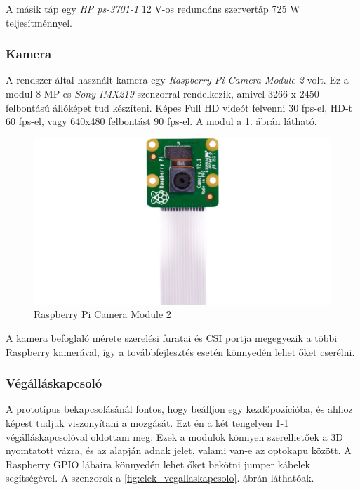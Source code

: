 \documentclass[12pt,a4paper]{article}
\begin{document}
A másik táp egy \textsl{HP ps-3701-1} 12 V-os redundáns szervertáp 725 W teljesítménnyel. 

\subsubsection*{Kamera}
A rendszer által használt kamera egy \textsl{Raspberry Pi Camera Module 2} volt.\cite{raspberrycam} Ez a modul 8 MP-es \textsl{Sony IMX219} szenzorral rendelkezik, amivel 3266 x 2450 felbontású állóképet tud készíteni. Képes Full HD videót felvenni 30 fps-el, HD-t 60 fps-el, vagy 640x480 felbontást 90 fps-el. A modul a \ref{fig:elek_raspberrycam}. ábrán látható.

\begin{figure}[h!]
	\centering
	\includegraphics[width=1\linewidth]{elek_raspberrycam}
	\caption{Raspberry Pi Camera Module 2}
	\label{fig:elek_raspberrycam}
\end{figure}

A kamera befoglaló mérete szerelési furatai és CSI portja megegyezik a többi Raspberry kamerával, így a továbbfejlesztés esetén könnyedén lehet őket cserélni.

\subsubsection*{Végálláskapcsoló}
A prototípus bekapcsolásánál fontos, hogy beálljon egy kezdőpozícióba, és ahhoz képest tudjuk viszonyítani a mozgását. Ezt én a két tengelyen 1-1 végálláskapcsolóval oldottam meg. Ezek a modulok könnyen szerelhetőek a 3D nyomtatott vázra, és az alapján adnak jelet, valami van-e az optokapu között. A Raspberry GPIO lábaira könnyedén lehet őket bekötni jumper kábelek segítségével. A szenzorok a \ref{fig:elek_vegallaskapcsolo}. ábrán láthatóak.
\end{document}
